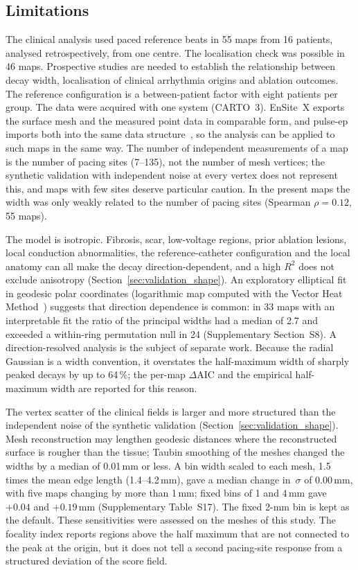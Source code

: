 \documentclass[a4paper,fleqn]{cas-dc}
\begin{document}
\subsection{Limitations}\label{sec:disc_limitations}
The clinical analysis used paced reference beats in 55 maps from
16 patients, analysed retrospectively, from one centre.  The localisation check was possible in
46 maps.  Prospective studies are needed to establish the relationship
between decay width, localisation of clinical arrhythmia origins and
ablation outcomes.  The reference configuration is a between-patient
factor with eight patients per group.  The data were acquired with one system (CARTO~3).  EnSite~X exports
the surface mesh and the measured point data in comparable form, and
pulse-ep imports both into the same data
structure~\citep{willert2026pulseep}, so the analysis can be applied to
such maps in the same way.  The
number of independent measurements of a map is the number of pacing
sites (7--135), not the number of mesh vertices; the synthetic
validation with independent noise at every vertex does not represent
this, and maps with few sites deserve particular caution.  In the
present maps the width was only weakly related to the number of pacing
sites (Spearman $\rho = 0.12$, 55 maps).

The model is isotropic.  Fibrosis, scar, low-voltage regions, prior
ablation lesions, local conduction abnormalities, the reference-catheter
configuration and the local anatomy can all make the decay
direction-dependent, and a high $R^2$ does not exclude anisotropy
(Section~\ref{sec:validation_shape}).  An exploratory
elliptical fit in geodesic polar coordinates (logarithmic map computed
with the Vector Heat Method~\citep{sharp2019vhm}) suggests that direction
dependence is common: in 33 maps with an interpretable fit the ratio of
the principal widths had a median of 2.7 and exceeded a within-ring
permutation null in 24 (Supplementary Section~S8).  A direction-resolved
analysis is the subject of separate work.  Because the radial Gaussian
is a width convention, it overstates the half-maximum width of sharply
peaked decays by up to 64\,\%; the per-map $\Delta\mathrm{AIC}$ and the
empirical half-maximum width are reported for this reason.

The vertex scatter of the clinical fields is larger and more
structured than the independent noise of the synthetic validation
(Section~\ref{sec:validation_shape}).  Mesh reconstruction may lengthen
geodesic distances where the reconstructed surface is rougher than the
tissue; Taubin smoothing of the meshes changed the widths by a median of
0.01\,mm or less.  A bin width scaled to each mesh, 1.5 times the mean
edge length (1.4--4.2\,mm), gave a median change in~$\sigma$ of
0.00\,mm, with five maps changing by more than 1\,mm; fixed bins of 1
and 4\,mm gave $+0.04$ and $+0.19$\,mm (Supplementary Table~S17).  The fixed
2-mm bin is kept as the default.  These sensitivities were assessed on
the meshes of this study.  The
focality index reports regions above the half maximum that are not
connected to the peak at the origin, but it does not tell a second
pacing-site response from a structured deviation of the score field.
\end{document}

